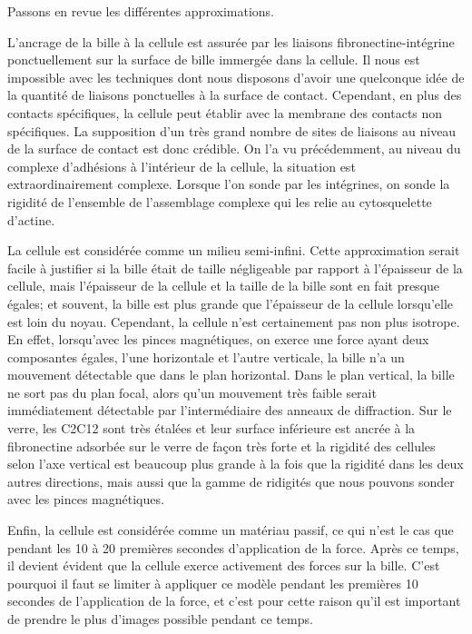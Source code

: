 \documentclass{report}
\begin{document}
	Passons en revue les différentes approximations.
	
	 L'ancrage de la bille à la cellule est assurée par les liaisons fibronectine-intégrine ponctuellement sur la surface de bille immergée dans la cellule. Il nous est impossible avec les techniques dont nous disposons d'avoir une quelconque idée de la quantité de liaisons ponctuelles à la surface de contact. Cependant, en plus des contacts spécifiques, la cellule peut établir avec la membrane des contacts non spécifiques. La supposition d'un très grand nombre de sites de liaisons au niveau de la surface de contact est donc crédible. On l'a vu précédemment, au niveau du complexe d'adhésions à l'intérieur de la cellule, la situation est extraordinairement complexe. Lorsque l'on sonde par les intégrines, on sonde la rigidité de l'ensemble de l'assemblage complexe qui les relie au cytosquelette d'actine. 
	
	La cellule est considérée comme un milieu semi-infini. 
	Cette approximation serait facile à justifier si la bille était de taille négligeable par rapport à l'épaisseur de la cellule, mais l'épaisseur de la cellule et la taille de la bille sont en fait presque égales; et souvent, la bille est plus grande que l'épaisseur de la cellule lorsqu'elle est loin du noyau. 
	Cependant, la cellule n'est certainement pas non plus isotrope. 
	En effet, lorsqu'avec les pinces magnétiques, on exerce une force ayant deux composantes égales, l'une horizontale et l'autre verticale, la bille n'a un mouvement détectable que dans le plan horizontal. 
	Dans le plan vertical, la bille ne sort pas du plan focal, alors qu'un mouvement très faible serait immédiatement détectable par l'intermédiaire des anneaux de diffraction. 
	Sur le verre, les C2C12 sont très étalées et leur surface inférieure est ancrée à la fibronectine adsorbée sur le verre de façon très forte et la rigidité des cellules selon l'axe vertical est beaucoup plus grande à la fois que la rigidité dans les deux autres directions, mais aussi que la gamme de ridigités que nous pouvons sonder avec les pinces magnétiques. 
	
	Enfin, la cellule est considérée comme un matériau passif, ce qui n'est le cas que pendant les 10 à 20 premières secondes d'application de la force. 
	Après ce temps, il devient évident que la cellule exerce activement des forces sur la bille. 
	C'est pourquoi il faut se limiter à appliquer ce modèle pendant les premières 10 secondes de l'application de la force, et c'est pour cette raison qu'il est important de prendre le plus d'images possible pendant ce temps. 
	
\end{document}

